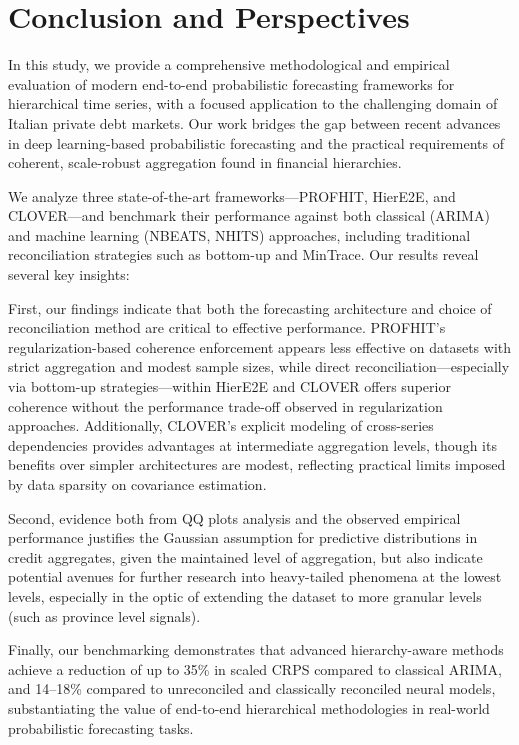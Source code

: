 \documentclass[letterpaper]{article}
\begin{document}
\section{Conclusion and Perspectives}

In this study, we provide a comprehensive methodological and empirical evaluation of modern end-to-end probabilistic forecasting frameworks for hierarchical time series, with a focused application to the challenging domain of Italian private debt markets. 
Our work bridges the gap between recent advances in deep learning-based probabilistic forecasting and the practical requirements of coherent, scale-robust aggregation found in financial hierarchies.

We analyze three state-of-the-art frameworks---PROFHIT, HierE2E, and CLOVER---and benchmark their performance against both classical (ARIMA) and machine learning (NBEATS, NHITS) approaches, including traditional reconciliation strategies such as bottom-up and MinTrace. 
Our results reveal several key insights:


First, our findings indicate that both the forecasting architecture and choice of reconciliation method are critical to effective performance. 
PROFHIT’s regularization-based coherence enforcement appears less effective on datasets with strict aggregation and modest sample sizes, 
while direct reconciliation---especially via bottom-up strategies---within HierE2E and CLOVER offers superior coherence without the performance trade-off observed in regularization approaches. 
Additionally, CLOVER’s explicit modeling of cross-series dependencies provides advantages at intermediate aggregation levels, though its benefits over simpler architectures are modest, reflecting practical limits imposed by data sparsity on covariance estimation.

Second, evidence both from QQ plots analysis and the observed empirical performance justifies the Gaussian assumption for predictive distributions in credit aggregates, 
given the maintained level of aggregation, but also indicate potential avenues for further research into heavy-tailed phenomena at the lowest levels,
 especially in the optic of extending the dataset to more granular levels (such as province level signals). 

Finally, our benchmarking demonstrates that advanced hierarchy-aware methods achieve a reduction of up to 35\% in scaled CRPS compared to classical ARIMA, 
and 14--18\% compared to unreconciled and classically reconciled neural models, 
substantiating the value of end-to-end hierarchical methodologies in real-world probabilistic forecasting tasks. 
\end{document}
